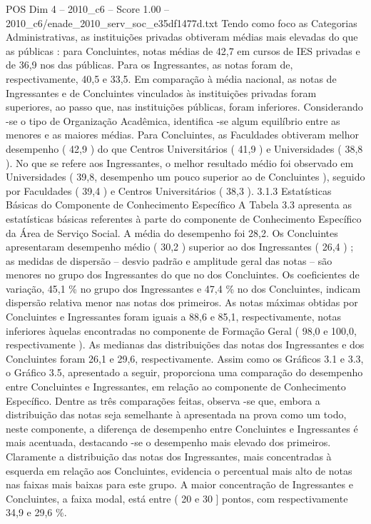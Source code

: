 \begin{textsample}{POS Dim 4 – 2010\_c6 – Score 1.00 – 2010\_c6/enade\_2010\_serv\_soc\_e35df1477d.txt}
Tendo como foco as Categorias Administrativas, as instituições privadas obtiveram médias mais elevadas do que as públicas : para Concluintes, notas médias de 42,7 em cursos de IES privadas e de 36,9 nos das públicas.
Para os Ingressantes, as notas foram de, respectivamente, 40,5 e 33,5.
Em comparação à média nacional, as notas de Ingressantes e de Concluintes vinculados às instituições privadas foram superiores, ao passo que, nas instituições públicas, foram inferiores.
Considerando -se o tipo de Organização Acadêmica, identifica -se algum equilíbrio entre as menores e as maiores médias.
Para Concluintes, as Faculdades obtiveram melhor desempenho ( 42,9 ) do que Centros Universitários ( 41,9 ) e Universidades ( 38,8 ).
No que se refere aos Ingressantes, o melhor resultado médio foi observado em Universidades ( 39,8, desempenho um pouco superior ao de Concluintes ), seguido por Faculdades ( 39,4 ) e Centros Universitários ( 38,3 ). 3.1.3 Estatísticas Básicas do Componente de Conhecimento Específico A Tabela 3.3 apresenta as estatísticas básicas referentes à parte do componente de Conhecimento Específico da Área de Serviço Social.
A média do desempenho foi 28,2.
Os Concluintes apresentaram desempenho médio ( 30,2 ) superior ao dos Ingressantes ( 26,4 ) ; as medidas de dispersão – desvio padrão e amplitude geral das notas – são menores no grupo dos Ingressantes do que no dos Concluintes.
Os coeficientes de variação, 45,1 \% no grupo dos Ingressantes e 47,4 \% no dos Concluintes, indicam dispersão relativa menor nas notas dos primeiros.
As notas máximas obtidas por Concluintes e Ingressantes foram iguais a 88,6 e 85,1, respectivamente, notas inferiores àquelas encontradas no componente de Formação Geral ( 98,0 e 100,0, respectivamente ).
As medianas das distribuições das notas dos Ingressantes e dos Concluintes foram 26,1 e 29,6, respectivamente.
Assim como os Gráficos 3.1 e 3.3, o Gráfico 3.5, apresentado a seguir, proporciona uma comparação do desempenho entre Concluintes e Ingressantes, em relação ao componente de Conhecimento Específico.
Dentre as três comparações feitas, observa -se que, embora a distribuição das notas seja semelhante à apresentada na prova como um todo, neste componente, a diferença de desempenho entre Concluintes e Ingressantes é mais acentuada, destacando -se o desempenho mais elevado dos primeiros.
Claramente a distribuição das notas dos Ingressantes, mais concentradas à esquerda em relação aos Concluintes, evidencia o percentual mais alto de notas nas faixas mais baixas para este grupo.
A maior concentração de Ingressantes e Concluintes, a faixa modal, está entre ( 20 e 30 ] pontos, com respectivamente 34,9 e 29,6 \%.

\end{textsample}
